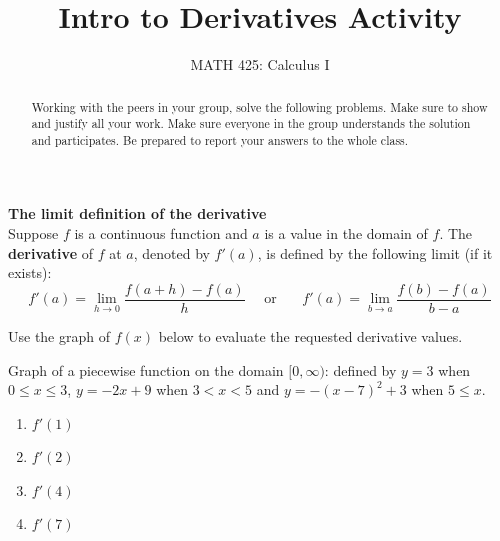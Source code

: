 \documentclass{ximera}
\title{Intro to Derivatives Activity}
\author{MATH 425: Calculus I}
\begin{document}
\begin{abstract}
    Working with the peers in your group, solve the following problems. Make sure to show and justify all your work. Make sure everyone in the group understands the solution and participates. Be prepared to report your answers to the whole class. 
\end{abstract}
\maketitle

\begin{definition}
        \textbf{The limit definition of the derivative}\\
        Suppose $f$ is a continuous function and $a$ is a value in the domain of $f$. The \textbf{derivative} of $f$ at $a$, denoted by $f'(a)$, is defined by the following limit (if it exists):
        $$f'(a)=\lim_{h\rightarrow 0}\frac{f(a+h)-f(a)}{h}\,\,\,\,\,\,\,\,\text{or}\,\,\,\,\,\,\,\,\,\,\,f'(a)=\lim_{b\rightarrow a}\frac{f(b)-f(a)}{b-a}$$
\end{definition}

\begin{exercise}
    Use the graph of $f(x)$ below to evaluate the requested derivative values.
    \begin{image}
    \end{image}
    \xmalt Graph of a piecewise function on the domain $[0,\infty)$: defined by $y=3$ when $0\leq x\leq 3$, $y=-2x+9$ when $3<x<5$ and $y=-(x-7)^2+3$ when $5\leq x$.
    \begin{enumerate}
        \item $f'(1)$
        \item $f'(2)$
        \item $f'(4)$
        \item $f'(7)$
    \end{enumerate}
\end{exercise}
\end{document}
